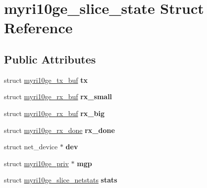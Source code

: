 \hypertarget{structmyri10ge__slice__state}{
\section{myri10ge\_\-slice\_\-state Struct Reference}
\label{structmyri10ge__slice__state}
}
\subsection*{Public Attributes}
\begin{DoxyCompactItemize}
\item 
\hypertarget{structmyri10ge__slice__state_a06959187437754043cd519c9f5ebc954}{
struct \hyperlink{structmyri10ge__tx__buf}{myri10ge\_\-tx\_\-buf} {\bfseries tx}}
\label{structmyri10ge__slice__state_a06959187437754043cd519c9f5ebc954}

\item 
\hypertarget{structmyri10ge__slice__state_acffc08fc3458dd3cfcfab07e78311aa7}{
struct \hyperlink{structmyri10ge__rx__buf}{myri10ge\_\-rx\_\-buf} {\bfseries rx\_\-small}}
\label{structmyri10ge__slice__state_acffc08fc3458dd3cfcfab07e78311aa7}

\item 
\hypertarget{structmyri10ge__slice__state_ac3ca8377d345be6f92e5aaec8aba9f63}{
struct \hyperlink{structmyri10ge__rx__buf}{myri10ge\_\-rx\_\-buf} {\bfseries rx\_\-big}}
\label{structmyri10ge__slice__state_ac3ca8377d345be6f92e5aaec8aba9f63}

\item 
\hypertarget{structmyri10ge__slice__state_a016e3e051d5b8b4e81d60ee9d7c39176}{
struct \hyperlink{structmyri10ge__rx__done}{myri10ge\_\-rx\_\-done} {\bfseries rx\_\-done}}
\label{structmyri10ge__slice__state_a016e3e051d5b8b4e81d60ee9d7c39176}

\item 
\hypertarget{structmyri10ge__slice__state_a13c728767167a963627065423fdc3a04}{
struct net\_\-device $\ast$ {\bfseries dev}}
\label{structmyri10ge__slice__state_a13c728767167a963627065423fdc3a04}

\item 
\hypertarget{structmyri10ge__slice__state_a37102f810db6bff60372c950324ad06f}{
struct \hyperlink{structmyri10ge__priv}{myri10ge\_\-priv} $\ast$ {\bfseries mgp}}
\label{structmyri10ge__slice__state_a37102f810db6bff60372c950324ad06f}

\item 
\hypertarget{structmyri10ge__slice__state_a31f6fd86c4a34644b15b20548fbbb1a2}{
struct \hyperlink{structmyri10ge__slice__netstats}{myri10ge\_\-slice\_\-netstats} {\bfseries stats}}
\label{structmyri10ge__slice__state_a31f6fd86c4a34644b15b20548fbbb1a2}


\end{DoxyCompactItemize}
